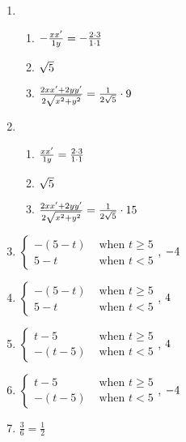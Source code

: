 \documentclass[12pt]{amsart}
\begin{document}
\begin{enumerate}
\item \begin{enumerate}
\item $-\frac{xx'}{\b y} = -\frac{\x \cdot \xchange}{\b \cdot \y}$
\item $\sqrt{5}$
\item $\frac{2xx'+2yy'}{2\sqrt{x^2+y^2}} = \frac{1}{2\sqrt{5}} \cdot 9$
\end{enumerate}

\item \begin{enumerate}
\item $\frac{xx'}{\b y} = \frac{\x \cdot \xchange}{\b \cdot \y}$
\item $\sqrt{5}$
\item $\frac{2xx'+2yy'}{2\sqrt{x^2+y^2}} = \frac{1}{2\sqrt{5}} \cdot 15$
\end{enumerate}
\def \a{5}\def \k{4}\def \abstop{1}\def \ktop{1}
\item $\begin{cases} -(\a -t) & \text{ when } t \geq \a \\ \a-t & \text{ when } t < \a \end{cases}$, $\ifthenelse{\ktop=1}{-\k}{-\frac{1}{\k}}$

\item $\begin{cases} -(\a -t) & \text{ when } t \geq \a \\ \a-t & \text{ when } t < \a \end{cases}$, $\ifthenelse{\ktop=1}{\k}{\frac{1}{\k}}$

\item $\begin{cases} t-\a & \text{ when } t \geq \a \\ -(t- \a) & \text{ when } t < \a \end{cases}$, $\ifthenelse{\ktop=1}{\k}{\frac{1}{\k}}$

\item $\begin{cases} t-\a & \text{ when } t \geq \a \\ -(t- \a) & \text{ when } t < \a \end{cases}$, $\ifthenelse{\ktop=1}{-\k}{-\frac{1}{\k}}$
\def \a{4}\def \b{1}\def \k{6}\def \fancyp{x^{2}-5x^{}+4}\def \simplep{6x^{}-24}\def \fancyreduced{3}\def \niceanstop{\frac{1}{2}}\def \niceansbottom{2}
\item $\frac{\fancyreduced}{\k} = \niceanstop$


\end{enumerate}
\end{document}
